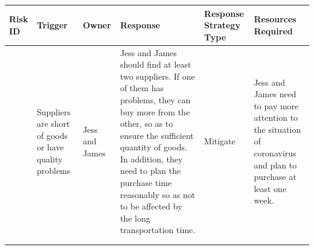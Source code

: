 \begin{table}
\begin{tabularx}{0.95\linewidth}{%
  >{\raggedright\arraybackslash}p{1cm}%
  >{\raggedright\arraybackslash}p{2cm}%
  >{\raggedright\arraybackslash}p{2cm}%
  >{\raggedright\arraybackslash}X%
  >{\raggedright\arraybackslash}p{2cm}%
  >{\raggedright\arraybackslash}p{2cm}}
  \toprule
  Risk ID & Trigger & Owner & Response & Response Strategy Type & Resources Required\\
  \midrule
  5
  & Suppliers are short of goods or have quality problems
  & Jess and James
  & Jess and James should find at least two suppliers. If one of them has problems, they can buy more from the other, so as to ensure the sufficient quantity of goods. In addition, they need to plan the purchase time reasonably so as not to be affected by the long transportation time.
  & Mitigate
  & Jess and James need to pay more attention to the situation of coronavirus and plan to purchase at least one week.
  \\
  \bottomrule
  \\
  \label{Risk Monitor 2}
\end{tabularx}
\end{table}
